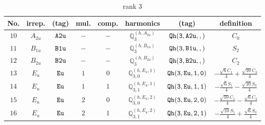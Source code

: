 \documentclass[fleqn,8pt]{jsarticle}
\begin{document}
\begin{table}[ht!]
\begin{center}
\caption{rank 3}
\renewcommand{\arraystretch}{1.3}
\begin{tabular}{cccccccc} \hline \hline
No. & irrep. & (tag) & mul. & comp. & harmonics & (tag) & definition \\ \hline
$ 10 $ & $ A_{2u} $ & $ {\tt A2u} $ & $ - $ & $ - $ & $ \mathbb{Q}_{3}^{(h,A_{2u})} $ & $ {\tt Qh(3,A2u,,)} $ & $ C_{0} $ \\
$ 11 $ & $ B_{1u} $ & $ {\tt B1u} $ & $ - $ & $ - $ & $ \mathbb{Q}_{3}^{(h,B_{1u})} $ & $ {\tt Qh(3,B1u,,)} $ & $ S_{2} $ \\
$ 12 $ & $ B_{2u} $ & $ {\tt B2u} $ & $ - $ & $ - $ & $ \mathbb{Q}_{3}^{(h,B_{2u})} $ & $ {\tt Qh(3,B2u,,)} $ & $ C_{2} $ \\
$ 13 $ & $ E_{u} $ & $ {\tt Eu} $ & $ 1 $ & $ 0 $ & $ \mathbb{Q}_{3,0}^{(h,E_{u},1)} $ & $ {\tt Qh(3,Eu,1,0)} $ & $ - \frac{\sqrt{6} C_{1}}{4} + \frac{\sqrt{10} C_{3}}{4} $ \\
$ 14 $ & $ E_{u} $ & $ {\tt Eu} $ & $ 1 $ & $ 1 $ & $ \mathbb{Q}_{3,1}^{(h,E_{u},1)} $ & $ {\tt Qh(3,Eu,1,1)} $ & $ - \frac{\sqrt{6} S_{1}}{4} - \frac{\sqrt{10} S_{3}}{4} $ \\
$ 15 $ & $ E_{u} $ & $ {\tt Eu} $ & $ 2 $ & $ 0 $ & $ \mathbb{Q}_{3,0}^{(h,E_{u},2)} $ & $ {\tt Qh(3,Eu,2,0)} $ & $ - \frac{\sqrt{10} C_{1}}{4} - \frac{\sqrt{6} C_{3}}{4} $ \\
$ 16 $ & $ E_{u} $ & $ {\tt Eu} $ & $ 2 $ & $ 1 $ & $ \mathbb{Q}_{3,1}^{(h,E_{u},2)} $ & $ {\tt Qh(3,Eu,2,1)} $ & $ - \frac{\sqrt{10} S_{1}}{4} + \frac{\sqrt{6} S_{3}}{4} $ \\
 \hline \hline
\end{tabular}
\end{center}
\end{table}
\end{document}
